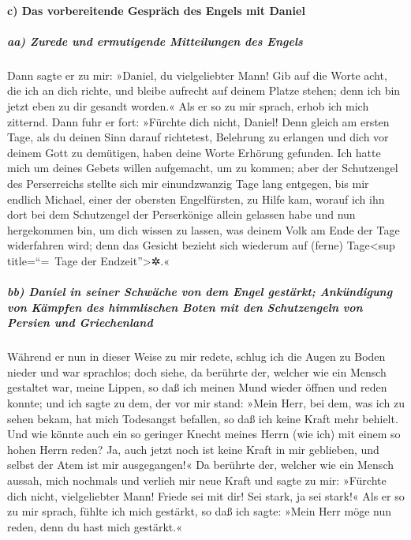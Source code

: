 \hypertarget{c-das-vorbereitende-gespruxe4ch-des-engels-mit-daniel}{%
\paragraph{c) Das vorbereitende Gespräch des Engels mit
Daniel}\label{c-das-vorbereitende-gespruxe4ch-des-engels-mit-daniel}}

\hypertarget{aa-zurede-und-ermutigende-mitteilungen-des-engels}{%
\subparagraph{aa) Zurede und ermutigende Mitteilungen des
Engels}\label{aa-zurede-und-ermutigende-mitteilungen-des-engels}}

Dann sagte er zu mir: »Daniel, du vielgeliebter Mann! Gib
auf die Worte acht, die ich an dich richte, und bleibe aufrecht auf
deinem Platze stehen; denn ich bin jetzt eben zu dir gesandt worden.«
Als er so zu mir sprach, erhob ich mich zitternd. Dann
fuhr er fort: »Fürchte dich nicht, Daniel! Denn gleich am ersten Tage,
als du deinen Sinn darauf richtetest, Belehrung zu erlangen und dich vor
deinem Gott zu demütigen, haben deine Worte Erhörung gefunden. Ich hatte
mich um deines Gebets willen aufgemacht, um zu kommen;
aber der Schutzengel des Perserreichs stellte sich mir
einundzwanzig Tage lang entgegen, bis mir endlich Michael, einer der
obersten Engelfürsten, zu Hilfe kam, worauf ich ihn dort bei dem
Schutzengel der Perserkönige allein gelassen habe und nun
hergekommen bin, um dich wissen zu lassen, was deinem Volk am Ende der
Tage widerfahren wird; denn das Gesicht bezieht sich wiederum auf
(ferne) Tage\textless sup title=``=~Tage der Endzeit''\textgreater✲.«

\hypertarget{bb-daniel-in-seiner-schwuxe4che-von-dem-engel-gestuxe4rkt-ankuxfcndigung-von-kuxe4mpfen-des-himmlischen-boten-mit-den-schutzengeln-von-persien-und-griechenland}{%
\subparagraph{bb) Daniel in seiner Schwäche von dem Engel gestärkt;
Ankündigung von Kämpfen des himmlischen Boten mit den Schutzengeln von
Persien und
Griechenland}\label{bb-daniel-in-seiner-schwuxe4che-von-dem-engel-gestuxe4rkt-ankuxfcndigung-von-kuxe4mpfen-des-himmlischen-boten-mit-den-schutzengeln-von-persien-und-griechenland}}

Während er nun in dieser Weise zu mir redete, schlug ich
die Augen zu Boden nieder und war sprachlos; doch siehe,
da berührte der, welcher wie ein Mensch gestaltet war, meine Lippen, so
daß ich meinen Mund wieder öffnen und reden konnte; und ich sagte zu
dem, der vor mir stand: »Mein Herr, bei dem, was ich zu sehen bekam, hat
mich Todesangst befallen, so daß ich keine Kraft mehr behielt.
Und wie könnte auch ein so geringer Knecht meines Herrn
(wie ich) mit einem so hohen Herrn reden? Ja, auch jetzt noch ist keine
Kraft in mir geblieben, und selbst der Atem ist mir ausgegangen!«
Da berührte der, welcher wie ein Mensch aussah, mich
nochmals und verlieh mir neue Kraft und sagte zu mir:
»Fürchte dich nicht, vielgeliebter Mann! Friede sei mit dir! Sei stark,
ja sei stark!« Als er so zu mir sprach, fühlte ich mich gestärkt, so daß
ich sagte: »Mein Herr möge nun reden, denn du hast mich gestärkt.«

